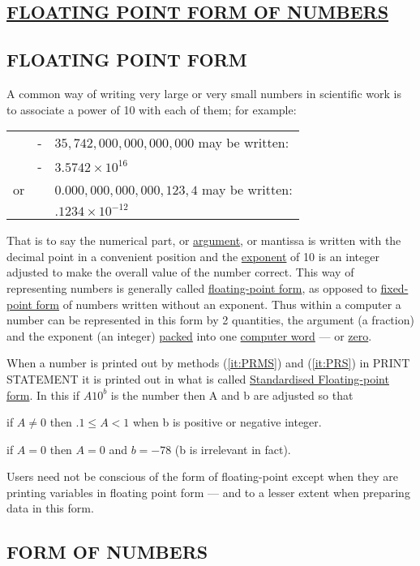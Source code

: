 \documentclass[10pt, a4paper, oneside]{article}
\newcommand{\myuline}[1]{\uline{#1}}
\begin{document}
\begin{multicols}{2}
\section{\myuline{FLOATING POINT FORM OF NUMBERS}}

\subsection{FLOATING POINT FORM}

A common way of writing very large or very small
numbers in scientific work is to associate a power
of 10 with each of them; for example:

\begin{tabular}{lrl}
   & - & $35,742,000,000,000,000$ may be written: \\
   & - & $3.5742 \times 10^{16}$ \\
or &   & $0.000,000,000,000,123,4$ may be written: \\
   &   & $.1234 \times 10^{-12}$ \\
\end{tabular}

That is to say the numerical part, or \myuline{argument}, or
mantissa is written with the decimal point in a
convenient position and the \myuline{exponent} of 10 is an integer
adjusted to make the overall value of the number
correct.  This way of representing numbers is generally
called \myuline{floating-point form}, as opposed to \myuline{fixed-point
form} of numbers written without an exponent.  Thus
within a computer a number can be represented in this
form by 2 quantities, the argument (a fraction) and
the exponent (an integer) \myuline{packed} into one \uline{computer
word} — or \myuline{zero}.

When a number is printed out by methods (\ref{it:PRMS}) and
(\ref{it:PRS}) in PRINT STATEMENT it is printed out in what is
called \myuline{Standardised Floating-point form}.  In this if
$A10^{b}$ is the number then A and b are adjusted so that

if $A \neq 0$ then $.1 \leqslant A < 1$ when b is positive or
negative integer.

if $A = 0$ then $A = 0$ and $b = -78$ (b is irrelevant
in fact).
\vspace{2pt}

Users need not be conscious of the form of
floating-point except when they are printing variables
in floating point form — and to a lesser extent when
preparing data in this form.


\subsection{FORM OF NUMBERS}


\end{multicols}
\end{document}
